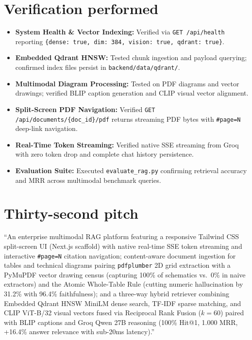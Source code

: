\documentclass[11pt,a4paper]{article}
\begin{document}
\section{Verification performed}
\begin{itemize}[leftmargin=1.0cm]
\item \textbf{System Health \& Vector Indexing:} Verified via \texttt{GET /api/health} reporting \texttt{\{dense: true, dim: 384, vision: true, qdrant: true\}}.
\item \textbf{Embedded Qdrant HNSW:} Tested chunk ingestion and payload querying; confirmed index files persist in \texttt{backend/data/qdrant/}.
\item \textbf{Multimodal Diagram Processing:} Tested on PDF diagrams and vector drawings; verified BLIP caption generation and CLIP visual vector alignment.
\item \textbf{Split-Screen PDF Navigation:} Verified \texttt{GET /api/documents/\{doc\_id\}/pdf} returns streaming PDF bytes with \texttt{\#page=N} deep-link navigation.
\item \textbf{Real-Time Token Streaming:} Verified native SSE streaming from Groq with zero token drop and complete chat history persistence.
\item \textbf{Evaluation Suite:} Executed \texttt{evaluate\_rag.py} confirming retrieval accuracy and MRR across multimodal benchmark queries.
\end{itemize}

\section{Thirty-second pitch}
``An enterprise multimodal RAG platform featuring a responsive Tailwind CSS split-screen UI (Next.js scaffold) with native real-time SSE token streaming and interactive \texttt{\#page=N} citation navigation; content-aware document ingestion for tables and technical diagrams pairing \texttt{pdfplumber} 2D grid extraction with a PyMuPDF vector drawing census (capturing 100\% of schematics vs.\ 0\% in naive extractors) and the Atomic Whole-Table Rule (cutting numeric hallucination by 31.2\% with 96.4\% faithfulness); and a three-way hybrid retriever combining Embedded Qdrant HNSW MiniLM dense search, TF-IDF sparse matching, and CLIP ViT-B/32 visual vectors fused via Reciprocal Rank Fusion ($k=60$) paired with BLIP captions and Groq Qwen 27B reasoning (100\% Hit@1, 1.000 MRR, +16.4\% answer relevance with sub-20ms latency).''
\end{document}
